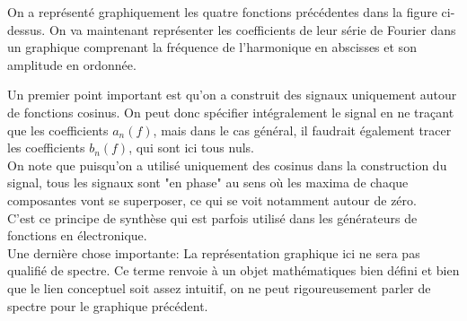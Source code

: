 \documentclass[11pt,a4paper]{article}
\begin{document}
On a représenté graphiquement les quatre fonctions précédentes dans la figure ci-dessus. On va maintenant représenter les coefficients de leur série de Fourier dans un graphique comprenant la fréquence de l'harmonique en abscisses et son amplitude en ordonnée.

\begin{center}
\end{center}

Un premier point important est qu'on a construit des signaux uniquement autour de fonctions cosinus. On peut donc spécifier intégralement le signal en ne traçant que les coefficients $a_n(f)$, mais dans le cas général, il faudrait également tracer les coefficients $b_n(f)$, qui sont ici tous nuls.\\

On note que puisqu'on a utilisé uniquement des cosinus dans la construction du signal, tous les signaux sont "en phase" au sens où les maxima de chaque composantes vont se superposer, ce qui se voit notamment autour de zéro.\\

C'est ce principe de synthèse qui est parfois utilisé dans les générateurs de fonctions en électronique.\\

Une dernière chose importante: La représentation graphique ici ne sera pas qualifié de spectre. Ce terme renvoie à un objet mathématiques bien défini et bien que le lien conceptuel soit assez intuitif, on ne peut rigoureusement parler de spectre pour le graphique précédent.\\
\end{document}
